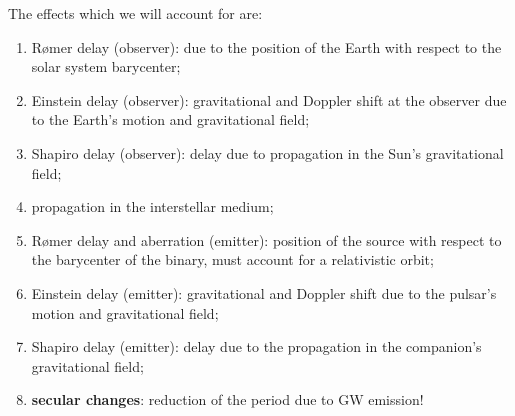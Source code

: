 \documentclass[main.tex]{subfiles}
\begin{document}
The effects which we will account for are: 
\begin{enumerate}
    \item Rømer delay (observer): due to the position of the Earth with respect to the solar system barycenter;
    \item Einstein delay (observer): gravitational and Doppler shift at the observer due to the Earth's motion and gravitational field;
    \item Shapiro delay (observer): delay due to propagation in the Sun's gravitational field;
    \item propagation in the interstellar medium;
    \item Rømer delay and aberration (emitter): position of the source with respect to the barycenter of the binary, must account for a relativistic orbit;
    \item Einstein delay (emitter): gravitational and Doppler shift due to the pulsar's motion and gravitational field;
    \item Shapiro delay (emitter): delay due to the propagation in the companion's gravitational field;
    \item \textbf{secular changes}: reduction of the period due to GW emission!
\end{enumerate}
\end{document}
